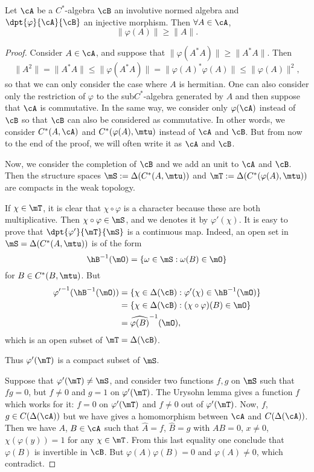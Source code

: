 \begin{proposition} \label{prop:vp_geq}
	Let $\cA$ be a $C^{*}$-algebra $\cB$ an involutive normed algebra and $\dpt{\varphi}{\cA}{\cB}$ an injective morphism. Then $\forall A\in\cA$,
	\begin{equation}
		\|\varphi(A)\|\geq\|A\|.
	\end{equation}
\end{proposition}

\begin{proof}
	Consider $A\in\cA$, and suppose that $\|\varphi(A^*A)\|\geq\|A^*A\|$. Then
	\[
		\|A^2\|=\|A^*A\|\leq\|\varphi(A^*A)\|=\|\varphi(A)^*\varphi(A)\|\leq\|\varphi(A)\|^2,
	\]
	so that we can only consider the case where $A$ is hermitian. One can also consider only the restriction of $\varphi$ to the sub$C^{*}$-algebra generated by $A$ and then suppose that $\cA$ is commutative. In the same way, we consider only $\varphi(\cA)$ instead of $\cB$ so that $\cB$ can also be considered as commutative. In other words, we consider $C^*(A,\cA)$ and $C^*(\varphi(A),\mtu)$ instead of $\cA$ and $\cB$. But from now to the end of the proof, we will often write it as $\cA$ and $\cB$.

	Now, we consider the completion of $\cB$ and we add an unit to $\cA$ and $\cB$. Then the structure spaces $\mS:=\Delta(C^*(A,\mtu))$ and $\mT:=\Delta(C^*(\varphi(A),\mtu))$ are compacts in the weak topology.

	If $\chi\in\mT$, it is clear that $\chi\circ\varphi$ is a character because these are both multiplicative. Then $\chi\circ\varphi\in\mS$, and we denotes it by $\varphi'(\chi)$. It is easy to prove that $\dpt{\varphi'}{\mT}{\mS}$ is a continuous map. Indeed, an open set in $\mS=\Delta(C^*(A,\mtu))$ is of the form
	\[
		\hB^{-1}(\mO)=\{ \omega\in\mS:\omega(B)\in\mO  \}
	\]
	for $B\in C^*(B,\mtu)$. But
	\begin{equation}
		\begin{split}
			{\varphi'}^{-1}(\hB^{-1}(\mO))&=\{ \chi\in\Delta(\cB):\varphi'(\chi)\in\hB^{-1}(\mO)  \}\\
			&=\{ \chi\in\Delta(\cB): (\chi\circ\varphi)(B)\in\mO  \} \\
			&=\widehat{\varphi(B)}^{-1}(\mO),
		\end{split}
	\end{equation}
	which is an open subset of $\mT=\Delta(\cB)$.

	Thus $\varphi'(\mT)$ is a compact subset of $\mS$.

	Suppose that $\varphi'(\mT)\neq\mS$, and consider two functions $f,g$ on $\mS$ such that $fg=0$, but $f\neq 0$ and $g=1$ on $\varphi'(\mT)$. The Urysohn lemma gives a function $f$ which works for it: $f=0$ on $\varphi'(\mT)$ and $f\neq 0$ out of $\varphi'(\mT)$. Now, $f$, $g\in C(\Delta(\cA))$ but we have gives a homomorphism between $\cA$ and $C(\Delta(\cA))$. Then we have $A$, $B\in\cA$ such that $\hat{A}=f$,  $\hat{B}=g$ with $AB=0$, $x\neq 0$, $\chi(\varphi(y))=1$ for any $\chi\in\mT$. From this last equality one conclude that $\varphi(B)$ is invertible in $\cB$. But $\varphi(A)\varphi(B)=0$ and $\varphi(A)\neq 0$, which contradict.


\end{proof}

